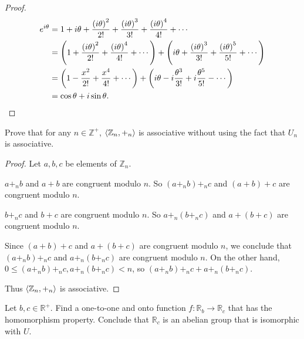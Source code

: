 \begin{proof}
    \begin{align*}
        e^{i\theta} & = 1 + i\theta + \frac{{(i\theta)}^{2}}{2!} + \frac{{(i\theta)}^{3}}{3!} + \frac{{(i\theta)}^{4}}{4!} + \cdots                                                                 \\
                    & = \left(1 + \frac{{(i\theta)}^{2}}{2!} + \frac{{(i\theta)}^{4}}{4!} + \cdots\right) + \left(i\theta + \frac{{(i\theta)}^{3}}{3!} + \frac{{(i\theta)}^{5}}{5!} + \cdots\right) \\
                    & = \left(1 - \frac{x^{2}}{2!} + \frac{x^{4}}{4!} + \cdots \right) + \left(i\theta - i\frac{\theta^{3}}{3!} + i\frac{\theta^{5}}{5!} - \cdots \right)                           \\
                    & = \cos{\theta} + i\sin{\theta}.\qedhere
    \end{align*}
\end{proof}

\begin{exercise}
    Prove that for any $n\in\mathbb{Z}^{+}$, $\left\langle{\mathbb{Z}_{n}, {+}_{n}}\right\rangle$ is associative without using the fact that $U_{n}$ is associative.
\end{exercise}

\begin{proof}
    Let $a, b, c$ be elements of $\mathbb{Z}_{n}$.

    $a {+}_{n} b$ and $a + b$ are congruent modulo $n$. So $(a {+}_{n} b) {+}_{n} c$ and $(a + b) + c$ are congruent modulo $n$.

    $b {+}_{n} c$ and $b + c$ are congruent modulo $n$. So $a {+}_{n} (b {+}_{n} c)$ and $a + (b + c)$ are congruent modulo $n$.

    Since $(a + b) + c$ and $a + (b + c)$ are congruent modulo $n$, we conclude that $(a {+}_{n} b) {+}_{n} c$ and $a {+}_{n} (b {+}_{n} c)$ are congruent modulo $n$. On the other hand, $0\le (a {+}_{n} b) {+}_{n} c, a {+}_{n} (b {+}_{n} c) < n$, so $(a {+}_{n} b) {+}_{n} c + a {+}_{n} (b {+}_{n} c)$.

    Thus $\left\langle{\mathbb{Z}_{n}, {+}_{n}}\right\rangle$ is associative.
\end{proof}

\begin{exercise}
    Let $b, c\in\mathbb{R}^{+}$. Find a one-to-one and onto function $f: \mathbb{R}_{b} \to \mathbb{R}_{c}$ that has the homomorphism property. Conclude that $\mathbb{R}_{c}$ is an abelian group that is isomorphic with $U$.
\end{exercise}

